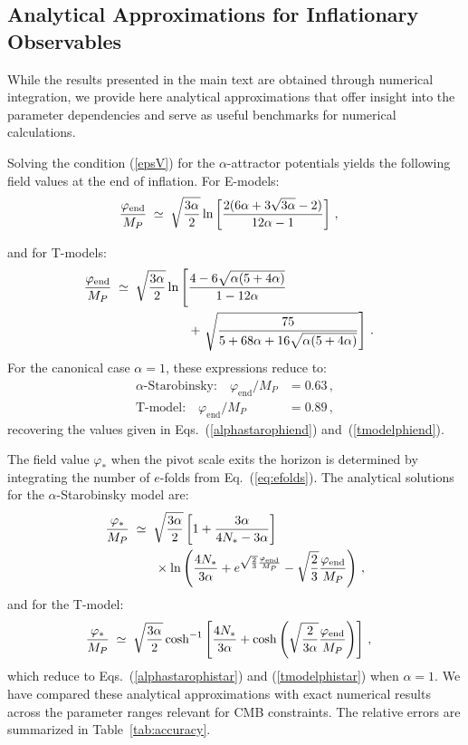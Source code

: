 \documentclass[aps,prev,twocolumn,preprintnumbers,floatfix,nofootinbib]{revtex4-1}
\begin{document}
\subsection{Analytical Approximations for Inflationary Observables}
\label{appB}

While the results presented in the main text are obtained through numerical integration, we provide here analytical approximations that offer insight into the parameter dependencies and serve as useful benchmarks for numerical calculations.


Solving the condition (\ref{epsV}) for the $\alpha$-attractor potentials yields the following field values at the end of inflation. For E-models:
\begin{align}
\label{eq:phiendE}
\frac{\varphi_{\rm{end}}}{M_P} & \; \simeq \; \sqrt{\frac{3\alpha}{2}} \ln\left[\frac{2(6\alpha + 3\sqrt{3\alpha}-2)}{12\alpha-1} \right] \,, & 
\end{align}

and for T-models:
\begin{align}
\label{eq:phiendT}
\frac{\varphi_{\rm{end}}}{M_P} & \; \simeq \;  \sqrt{\frac{3\alpha}{2}}  \ln\left[ \frac{4-6\sqrt{\alpha(5+4\alpha)}}{1-12\alpha}\right.  & \nonumber\\
& \qquad\qquad\qquad +\left.\sqrt{\frac{75}{5+68\alpha+16\sqrt{\alpha(5+4\alpha)}}}\right] \, . & 
\end{align}
For the canonical case $\alpha = 1$, these expressions reduce to:
\begin{align}
\text{$\alpha$-Starobinsky:} \quad \varphi_{\mathrm{end}}/M_P &= 0.63 \,, \\
\text{T-model:} \quad \varphi_{\mathrm{end}}/M_P &= 0.89 \,,
\end{align}
recovering the values given in Eqs.~(\ref{alphastarophiend}) and~(\ref{tmodelphiend}).


The field value $\varphi_*$ when the pivot scale exits the horizon is determined by integrating the number of $e$-folds from Eq.~(\ref{eq:efolds}). The analytical solutions for the $\alpha$-Starobinsky model are:
\begin{align}
\label{eq:phistarstaro} \notag
\frac{\varphi_{*}}{M_P} & \; \simeq \; \sqrt{\frac{3\alpha}{2}}
\left[1 + \frac{3\alpha}{4N_*-3\alpha} \right] \\
& \qquad \times
\ln\left(\frac{4N_*}{3\alpha} + e^{\sqrt{\frac{2}{3}} \frac{\varphi_{\rm{end}}}{M_P}} - \sqrt{\frac{2}{3}} \frac{\varphi_{\rm{end}}}{M_P} \right)  \,, 
\end{align}
and for the T-model:
\begin{align}
\label{eq:phistarT}
\frac{\varphi_{*}}{M_P} & \; \simeq \;  \sqrt{\frac{3\alpha}{2}}  \cosh^{-1} \left[\frac{4N_*}{3\alpha} + \cosh\left(\sqrt{\frac{2}{3\alpha}} \frac{\varphi_{\rm{end}}}{M_P} \right) \right] \, ,
\end{align}
which reduce to Eqs.~(\ref{alphastarophistar}) and (\ref{tmodelphistar}) when $\alpha = 1$.
We have compared these analytical approximations with exact numerical results across the parameter ranges relevant for CMB constraints. The relative errors are summarized in Table~\ref{tab:accuracy}.
\end{document}

